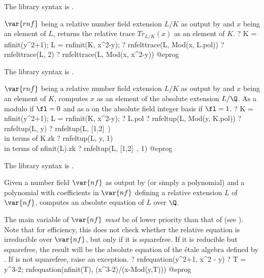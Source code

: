 The library syntax is .

\label{se:rnfelttrace}
$\var{rnf}$ being a relative number field extension $L/K$ as output by
 and $x$ being an element of $L$, returns the relative trace
$Tr_{L/K}(x)$ as an element of $K$.
\bprog
? K = nfinit(y^2+1); L = rnfinit(K, x^2-y);
? rnfelttrace(L, Mod(x, L.pol))
? rnfelttrace(L, 2)
? rnfelttrace(L, Mod(x, x^2-y))
@eprog

The library syntax is .

\label{se:rnfeltup}
$\var{rnf}$ being a relative number field extension $L/K$ as output by
 and $x$ being an element of $K$, computes $x$ as an element of
the absolute extension $L/\Q$. As a  modulo 
if $\fl = 0$ and as a  on the absolute field integer basis if
$\fl = 1$.
\bprog
? K = nfinit(y^2+1); L = rnfinit(K, x^2-y);
? L.pol
? rnfeltup(L, Mod(y, K.pol))
? rnfeltup(L, y)
? rnfeltup(L, [1,2]~) \\ in terms of K.zk
? rnfeltup(L, y, 1) \\ in terms of nfinit(L).zk
? rnfeltup(L, [1,2]~, 1)
@eprog

The library syntax is .

\label{se:rnfequation}
Given a number field
$\var{nf}$ as output by  (or simply a polynomial) and a
polynomial  with coefficients in $\var{nf}$ defining a relative
extension $L$ of $\var{nf}$, computes an absolute equation of $L$ over
$\Q$.

The main variable of $\var{nf}$ \emph{must} be of lower priority than that
of  (see ). Note that for efficiency, this does
not check whether the relative equation is irreducible over $\var{nf}$, but
only if it is squarefree. If it is reducible but squarefree, the result will
be the absolute equation of the \'etale algebra defined by . If
 is not squarefree, raise an  exception.
\bprog
? rnfequation(y^2+1, x^2 - y)
? T = y^3-2; rnfequation(nfinit(T), (x^3-2)/(x-Mod(y,T)))
@eprog

